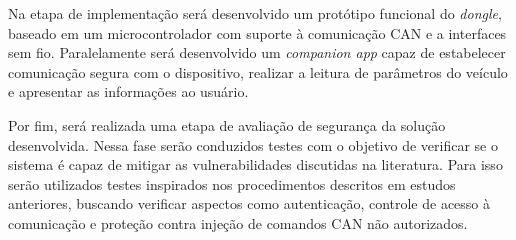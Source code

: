Na etapa de implementação será desenvolvido um protótipo funcional do
\textit{dongle}, baseado em um microcontrolador com suporte à comunicação CAN
e a interfaces sem fio. Paralelamente será desenvolvido um \textit{companion
app} capaz de estabelecer comunicação segura com o dispositivo, realizar a
leitura de parâmetros do veículo e apresentar as informações ao usuário.

Por fim, será realizada uma etapa de avaliação de segurança da solução
desenvolvida. Nessa fase serão conduzidos testes com o objetivo de verificar
se o sistema é capaz de mitigar as vulnerabilidades discutidas na literatura.
Para isso serão utilizados testes inspirados nos procedimentos descritos em
estudos anteriores, buscando verificar aspectos como autenticação, controle de
acesso à comunicação e proteção contra injeção de comandos CAN não
autorizados.

